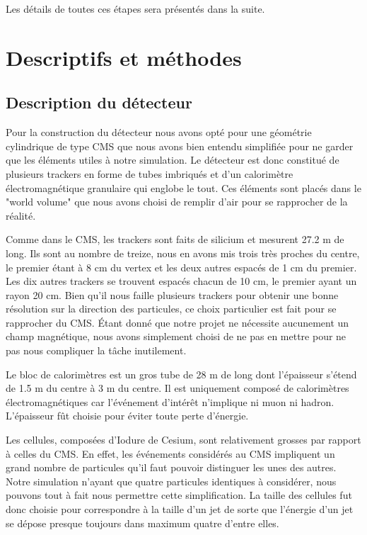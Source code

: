 \documentclass[11pt]{article}
\begin{document}
Les d\'etails de toutes ces \'etapes sera pr\'esent\'es dans la suite.





		    \section{Descriptifs et méthodes}

\subsection{Description du détecteur}

Pour la construction du détecteur nous avons opté pour une géométrie cylindrique
de type CMS que nous avons bien entendu simplifiée pour ne garder que les
éléments utiles à notre simulation. Le détecteur est donc constitué de plusieurs
trackers en forme de tubes imbriqués et d'un calorimètre
électromagnétique granulaire qui englobe le tout. Ces éléments sont placés dans
le "world volume" que nous avons choisi de remplir d'air pour se rapprocher de
la réalité.

Comme dans le CMS, les trackers sont faits de silicium et mesurent 27.2 m de
long. Ils sont au nombre de treize, nous en avons mis trois très proches du
centre, le premier étant à 8 cm du vertex et les deux autres espacés de 1 cm du
premier. Les dix autres trackers se trouvent espacés chacun de 10 cm, le premier
ayant un rayon 20 cm. Bien qu'il nous faille plusieurs trackers pour obtenir
une bonne résolution sur la direction des particules, ce choix particulier est
fait pour se rapprocher du CMS. Étant donné que notre projet ne nécessite
aucunement un champ magnétique, nous avons simplement choisi de ne pas en
mettre pour ne pas nous compliquer la tâche inutilement. 

Le bloc de calorimètres est un gros tube de 28 m de long dont
l'épaisseur s'étend de 1.5 m du centre à 3 m du centre. Il est uniquement
composé de calorimètres électromagnétiques car l'événement d'intérêt n'implique
ni muon ni hadron. L'épaisseur fût choisie pour éviter toute perte d'énergie.

Les cellules, composées d'Iodure de Cesium, sont relativement grosses par
rapport à celles du CMS. En effet, les événements considérés au CMS impliquent
un grand nombre de particules qu'il faut pouvoir distinguer les unes des
autres. Notre simulation n'ayant que quatre particules identiques à considérer,
nous pouvons tout à fait nous permettre cette simplification. La taille des
cellules fut donc choisie pour correspondre à la taille d'un jet de sorte que
l'énergie d'un jet se dépose presque toujours dans maximum quatre d'entre elles.
\end{document}

